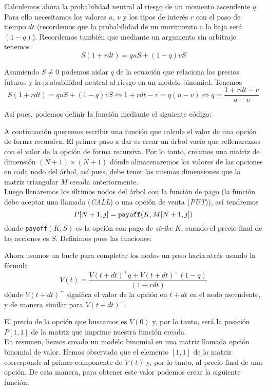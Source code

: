 \documentclass[a4paper,]{article}
\begin{document}
Calculemos ahora la probabilidad neutral al riesgo de un momento ascendente $q$. Para ello necesitamos los valores $u$, $v$ y los tipos de interés $r$ con el paso de tiempo $dt$ (recordemos que la probabilidad de un movimiento a la baja será $(1-q)$). Recordemos también que mediante un argumento sin arbitraje tenemos
$$S(1+rdt) = quS+(1-q)vS$$

Asumiendo $S\neq 0$ podemos aislar $q$ de la ecuación que relaciona los precios futuros y la probabilidad neutral al riesgo en un modelo binomial. Tenemos
$$S(1+rdt) = quS+(1-q)vS \Longleftrightarrow 1+rdt-v=q(u-v)\Longleftrightarrow q=\frac{1+rdt-v}{u-v}$$

Así pues, podemos definir la función mediante el siguiente código: 
\vspace{1cm}

A continuación queremos escribir una función que calcule el valor de una opción de forma recursiva. El primer paso a dar es crear un árbol vacío que rellenaremos con el valor de la opción de forma recursiva. Por lo tanto, creamos una matriz de dimensión $(N+1)\times (N+1)$ dónde almacenaremos los valores de las opciones en cada nodo del árbol, así pues, debe tener las mismas dimensiones que la matriz triangular $M$ creada anteriormente.\\

Luego llenaremos los últimos nodos del árbol con la función de pago (la función debe aceptar una llamada (\textit{CALL}) o una opción de venta (\textit{PUT})), así tendremos 
$$P[N+1,j]=\mbox{\texttt{payoff}}(K, M[N+1,j])$$
donde \texttt{payoff}$(K,S)$ es la opción con pago de \textit{strike} $K$, cuando el precio final de las acciones es $S$. Definimos pues las funciones:
\vspace{1cm}

Ahora usamos un bucle para completar los nodos un paso hacia atrás usando la fórmula
$$V(t)=\frac{V(t+dt)^{+}q+V(t+dt)^{-}(1-q)}{(1+rdt)}$$
dónde $V(t+dt)^{+}$ significa el valor de la opción en $t+dt$ en el nodo ascendente, y de manera similar para $V(t+dt)^{-}$.
\vspace{1cm}

El precio de la opción que buscamos es $V(0)$ y, por lo tanto, será la posición $P[1,1]$ de la matriz que imprime nuestra función creada.\\

En resumen, hemos creado un modelo binomial en una matriz llamada opción binomial de valor. Hemos observado que el elemento $[1,1]$ de la matriz corresponde al primer componente de $V(t)$ y, por lo tanto, al precio final de una opción. De esta manera, para obtener este valor podemos crear la siguiente función:
\end{document}
